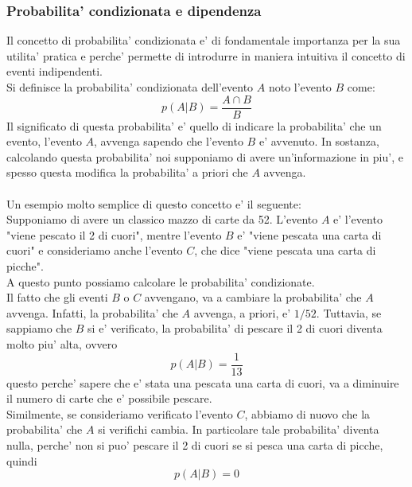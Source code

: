 \documentclass[12pt]{article}
\begin{document}
\subsubsection{Probabilita' condizionata e dipendenza}
Il concetto di probabilita' condizionata e' di fondamentale importanza per la sua utilita' pratica e perche' permette di introdurre in maniera intuitiva il concetto di eventi indipendenti. \\
Si definisce la probabilita' condizionata dell'evento $A$ noto l'evento $B$ come:
$$
	p(A|B) = \frac{A \cap B}{B}
$$
Il significato di questa probabilita' e' quello di indicare la probabilita' che un evento, l'evento $A$, avvenga sapendo che l'evento $B$ e' avvenuto. In sostanza, calcolando questa probabilita' noi supponiamo di avere un'informazione in piu', e spesso questa modifica la probabilita' a priori che $A$ avvenga. \\ \\
Un esempio molto semplice di questo concetto e' il seguente: \\
Supponiamo di avere un classico mazzo di carte da 52. L'evento $A$ e' l'evento "viene pescato il 2 di cuori", mentre l'evento $B$ e' "viene pescata una carta di cuori" e consideriamo anche l'evento $C$, che dice "viene pescata una carta di picche". \\
A questo punto possiamo calcolare le probabilita' condizionate. \\
Il fatto che gli eventi $B$ o $C$ avvengano, va a cambiare la probabilita' che $A$ avvenga. Infatti, la probabilita' che $A$ avvenga, a priori, e' $1/52$. Tuttavia, se sappiamo che $B$ si e' verificato, la probabilita' di pescare il 2 di cuori diventa molto piu' alta, ovvero
$$
	p(A|B) = \frac{1}{13}
$$
questo perche' sapere che e' stata una pescata una carta di cuori, va a diminuire il numero di carte che e' possibile pescare. \\
Similmente, se consideriamo verificato l'evento $C$, abbiamo di nuovo che la probabilita' che $A$ si verifichi cambia. In particolare tale probabilita' diventa nulla, perche' non si puo' pescare il 2 di cuori se si pesca una carta di picche, quindi
$$
	p(A|B) = 0
$$
\end{document}
